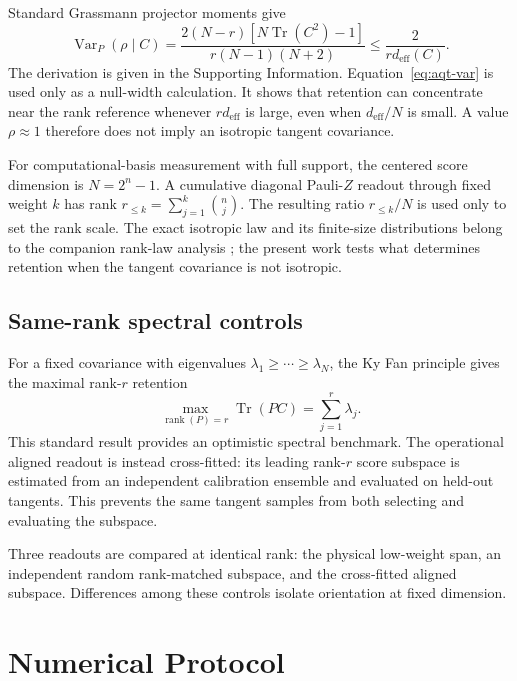 Standard Grassmann projector moments give
\begin{equation}
\operatorname{Var}_P(\rho\mid C)=
\frac{2(N-r)\left[N\operatorname{Tr}(C^2)-1\right]}
{r(N-1)(N+2)}
\le \frac{2}{r d_{\mathrm{eff}}(C)}.
\label{eq:aqt-var}
\end{equation}
The derivation is given in the Supporting Information. Equation~\eqref{eq:aqt-var} is used only as a null-width calculation. It shows that retention can concentrate near the rank reference whenever $r d_{\mathrm{eff}}$ is large, even when $d_{\mathrm{eff}}/N$ is small. A value $\rho\approx1$ therefore does not imply an isotropic tangent covariance.

For computational-basis measurement with full support, the centered score dimension is $N=2^n-1$. A cumulative diagonal Pauli-$Z$ readout through fixed weight $k$ has rank $r_{\le k}=\sum_{j=1}^k\binom nj$. The resulting ratio $r_{\le k}/N$ is used only to set the rank scale. The exact isotropic law and its finite-size distributions belong to the companion rank-law analysis \cite{AitHaddou2026IsotropicRankLaws}; the present work tests what determines retention when the tangent covariance is not isotropic.

\subsection{Same-rank spectral controls}

For a fixed covariance with eigenvalues $\lambda_1\ge\cdots\ge\lambda_N$, the Ky Fan principle gives the maximal rank-$r$ retention
\begin{equation}
 \max_{\operatorname{rank}(P)=r}\operatorname{Tr}(PC)
 =\sum_{j=1}^{r}\lambda_j.
\label{eq:aqt-kyfan}
\end{equation}
This standard result \cite{KyFan1949} provides an optimistic spectral benchmark. The operational aligned readout is instead cross-fitted: its leading rank-$r$ score subspace is estimated from an independent calibration ensemble and evaluated on held-out tangents. This prevents the same tangent samples from both selecting and evaluating the subspace.

Three readouts are compared at identical rank: the physical low-weight span, an independent random rank-matched subspace, and the cross-fitted aligned subspace. Differences among these controls isolate orientation at fixed dimension.

\section{Numerical Protocol}

